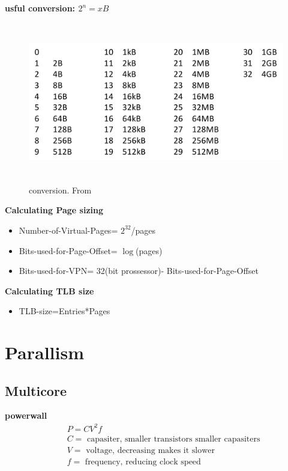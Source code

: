 \textbf{usful conversion: $2^n=xB$}
\begin{figure}[h]
    \vspace{10mm}
    \centering
    \includegraphics[width=16cm, height=7cm]{image/conversion.png}
    \caption{conversion. From \cite{}}
\end{figure}


\textbf{Calculating Page sizing}
\begin{itemize}
\item  Number-of-Virtual-Pages= $2^{32}$/pages
\item  Bits-used-for-Page-Offset= $\log$(pages)
\item  Bits-used-for-VPN= 32(bit prossessor)- Bits-used-for-Page-Offset
\end{itemize}

\textbf{Calculating TLB size}
\begin{itemize}
\item  TLB-size=Entries*Pages
\end{itemize}


\newpage


\section{Parallism}

\subsection{Multicore}
\textbf{powerwall}
\begin{align*}
  &\quad P=CV^2f \\
  &\quad C= \text{ capasiter, smaller transistors smaller capasiters} \\
  &\quad V= \text{ voltage, decreasing makes it slower} \\
  &\quad f= \text{ frequency, reducing clock speed} \\
\end{align*}


